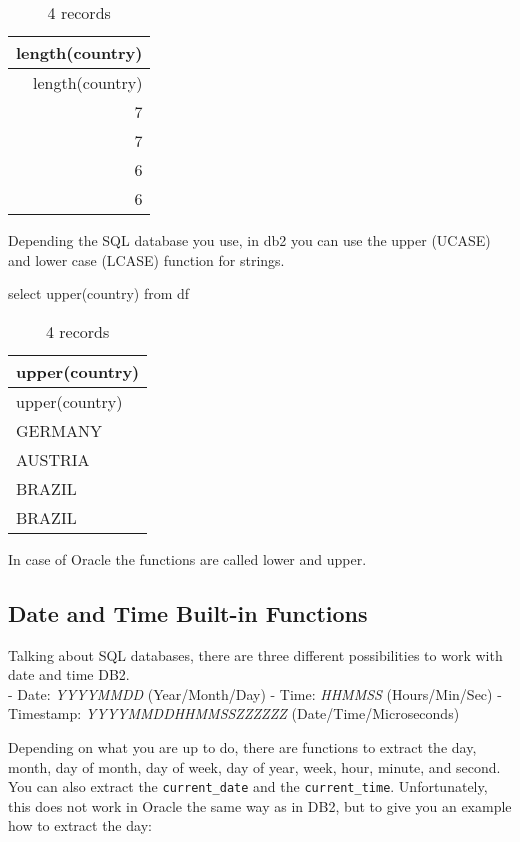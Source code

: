 \documentclass[
  letterpaper,
  DIV=11,
  numbers=noendperiod]{scrreprt}
\newenvironment{Shaded}{\begin{snugshade}}{\end{snugshade}}
\newcommand{\FunctionTok}[1]{\textcolor[rgb]{0.28,0.35,0.67}{#1}}
\newcommand{\KeywordTok}[1]{\textcolor[rgb]{0.00,0.23,0.31}{#1}}
\newcommand{\NormalTok}[1]{\textcolor[rgb]{0.00,0.23,0.31}{#1}}
\begin{document}
\begin{longtable}[]{@{}r@{}}
\caption{4 records}\tabularnewline
\toprule()
length(country) \\
\midrule()
\endfirsthead
\toprule()
length(country) \\
\midrule()
\endhead
7 \\
7 \\
6 \\
6 \\
\bottomrule()
\end{longtable}

Depending the SQL database you use, in db2 you can use the upper (UCASE)
and lower case (LCASE) function for strings.

\begin{Shaded}
\begin{Highlighting}[]
\KeywordTok{select} \FunctionTok{upper}\NormalTok{(country) }\KeywordTok{from}\NormalTok{ df}
\end{Highlighting}
\end{Shaded}

\begin{longtable}[]{@{}l@{}}
\caption{4 records}\tabularnewline
\toprule()
upper(country) \\
\midrule()
\endfirsthead
\toprule()
upper(country) \\
\midrule()
\endhead
GERMANY \\
AUSTRIA \\
BRAZIL \\
BRAZIL \\
\bottomrule()
\end{longtable}

In case of Oracle the functions are called lower and upper.

\hypertarget{date-and-time-built-in-functions}{%
\subsection{Date and Time Built-in
Functions}\label{date-and-time-built-in-functions}}

Talking about SQL databases, there are three different possibilities to
work with date and time DB2.\\
- Date: \emph{YYYYMMDD} (Year/Month/Day) - Time: \emph{HHMMSS}
(Hours/Min/Sec) - Timestamp: \emph{YYYYMMDDHHMMSSZZZZZZ}
(Date/Time/Microseconds)

Depending on what you are up to do, there are functions to extract the
day, month, day of month, day of week, day of year, week, hour, minute,
and second. You can also extract the \texttt{current\_date} and the
\texttt{current\_time}. Unfortunately, this does not work in Oracle the
same way as in DB2, but to give you an example how to extract the day:
\end{document}
